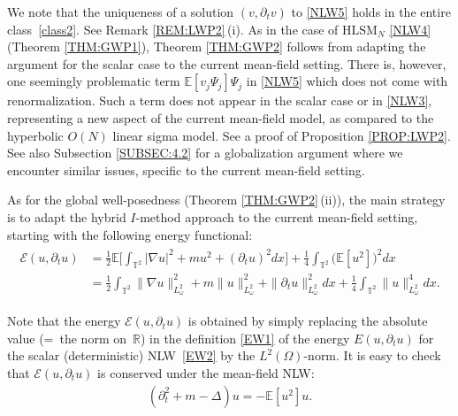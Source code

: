 \documentclass[letterpaper, 11pt,  reqno]{amsart}
\newcommand{\1}{\hspace{0.5mm}\text{I}\hspace{0.2mm}}
\newcommand{\noi}{\noindent}
\newcommand{\R}{\mathbb{R}}
\newcommand{\T}{\mathbb{T}}
\newcommand{\E}{\mathbb{E}}
\newcommand{\Dl}{\Delta}
\newcommand{\dt}{\partial_t}
\newcommand{\nb}{\nabla}
\newcommand{\EE}{\mathcal{E}}
\newcommand{\HLS}{$\text{HLSM}_N$ }
\renewcommand{\O}{\Omega}
\renewcommand{\o}{\omega}
\numberwithin{equation}{section}
\numberwithin{theorem}{section}
\begin{document}
We note that 
 the uniqueness of a solution $(v, \dt v)$ to \eqref{NLW5}
holds in the entire class~\eqref{class2}.
See Remark \ref{REM:LWP2}\,(i).
As in the case of \HLS \eqref{NLW4}
(Theorem \ref{THM:GWP1}), 
Theorem \ref{THM:GWP2}
follows from adapting the argument for the scalar case \cite{GKOT}
to the current mean-field setting.
There is, however, one
seemingly  problematic term
$\E [ v_j \Psi_j  ] \Psi_j $
in \eqref{NLW5} which does not come with renormalization. 
Such a term does not appear in the scalar case \cite{GKOT}
or in \eqref{NLW3}, 
representing 
a new aspect of the current mean-field model, 
 as compared to
the hyperbolic $O(N)$ linear sigma model.
See a proof of 
Proposition \ref{PROP:LWP2}.
See also Subsection \ref{SUBSEC:4.2}
for a  globalization argument
where we encounter similar issues, specific
to the current mean-field setting.



As for the global well-posedness (Theorem \ref{THM:GWP2}\,(ii)), 
the main strategy is to adapt
the hybrid $I$-method approach \cite{GKOT}
to the current mean-field setting, starting
with the following energy functional:
\begin{align}
\begin{split}
\EE (u, \dt  u) 
& = 
\frac 12 \E \bigg[ \int_{\T^2} 
|\nb  u|^2  + m u^2 +  (\dt u)^2 d x \bigg] + \frac 14 \int_{\T^2} \big(\E [u^2]\big)^2 d x\\
& = 
\frac 12  \int_{\T^2} 
\|\nb  u\|_{L^2_\o}^2  + m \|u\|_{L^2_\o}^2 +  \|\dt u\|_{L^2_\o}^2 d x  + \frac 14 \int_{\T^2} 
\|u\|_{L^2_\o}^4 d x.
\end{split}
\label{MFE1}
\end{align}

\noi
Note that 
the energy $\EE (u, \dt  u) $
is obtained
by simply replacing  the absolute value (=~the norm on~$\R$)
in the definition \eqref{EW1} of the energy $E(u, \dt u)$  
 for the scalar (deterministic) NLW~\eqref{EW2}
by the $L^2(\O)$-norm.
It is easy to  check that 
$\EE (u, \dt  u) $ is conserved
under the mean-field NLW:
\begin{align}
    (\dt^2 + m - \Dl) u = - \E[u^2] u .
\label{NLWz3}
\end{align}
\end{document}
